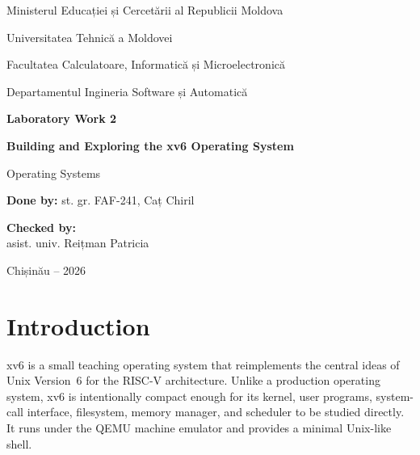 \documentclass[12pt]{article}
\begin{document}

\begin{titlepage}
    \centering

    {\large Ministerul Educației și Cercetării al Republicii Moldova\par}
    \vspace{0.45cm}
    {\large Universitatea Tehnică a Moldovei\par}
    \vspace{0.45cm}
    {\large Facultatea Calculatoare, Informatică și Microelectronică\par}
    \vspace{0.45cm}
    {\large Departamentul Ingineria Software și Automatică\par}

    \vspace{3cm}

    {\Large\bfseries Laboratory Work 2\par}
    \vspace{0.55cm}
    {\LARGE\bfseries Building and Exploring the xv6 Operating System\par}
    \vspace{0.35cm}
    {\large Operating Systems\par}

    \vfill

    \begin{flushleft}
        \textbf{Done by:} st. gr. FAF-241, Caț Chiril

        \vspace{1cm}

        \textbf{Checked by:}\\
        asist. univ. Reițman Patricia
    \end{flushleft}

    \vfill

    {Chișinău -- 2026\par}
\end{titlepage}

\tableofcontents
\clearpage
{}

\section{Introduction}

xv6 is a small teaching operating system that reimplements the central ideas of Unix Version~6 for the RISC-V architecture. Unlike a production operating system, xv6 is intentionally compact enough for its kernel, user programs, system-call interface, filesystem, memory manager, and scheduler to be studied directly. It runs under the QEMU machine emulator and provides a minimal Unix-like shell.
\end{document}
